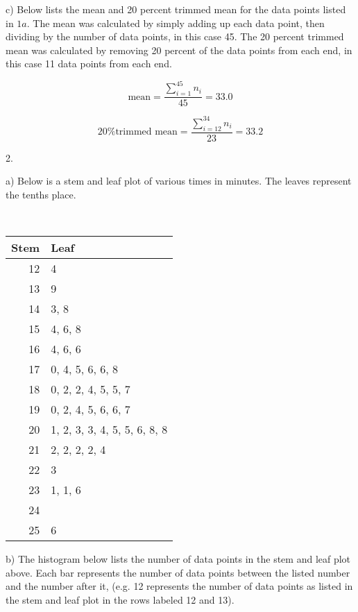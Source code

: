 \documentclass[12pt, letterpaper]{article}
\begin{document}
\qquad c) Below lists the mean and 20 percent trimmed mean for the data points listed in $1a$. The mean was calculated by simply adding up each data point, then dividing by the number of data points, in this case 45. The 20 percent trimmed mean was calculated by removing 20 percent of the data points from each end, in this case 11 data points from each end.

$$\text{mean} = \frac{\sum\limits_{i=1}^{45} n_{i}}{45} = \boxed{33.0}$$

$$\text{20\% trimmed mean} = \frac{\sum\limits_{i=12}^{34} n_{i}}{23} = \boxed{33.2}$$

\pagebreak

2.

\qquad a) Below is a stem and leaf plot of various times in minutes. The leaves represent the tenths place.
\begin{table}[h!]{ \ \ \ }
	\centering
	\begin{tabular}{r|l}
		\textbf{Stem} & \textbf{Leaf} \\ \hline
        12 & 4 \\
        13 & 9\\
        14 & 3, 8\\
        15 & 4, 6, 8\\
        16 & 4, 6, 6\\
        17 & 0, 4, 5, 6, 6, 8\\
        18 & 0, 2, 2, 4, 5, 5, 7\\
        19 & 0, 2, 4, 5, 6, 6, 7\\
        20 & 1, 2, 3, 3, 4, 5, 5, 6, 8, 8\\
        21 & 2, 2, 2, 2, 4\\
        22 & 3\\
        23 & 1, 1, 6\\
        24 & \\
        25 & 6\\
	\end{tabular}
\end{table}

\qquad b) The histogram below lists the number of data points in the stem and leaf plot above. Each bar represents the number of data points between the listed number and the number after it, (e.g. 12 represents the number of data points as listed in the stem and leaf plot in the rows labeled 12 and 13).
\begin{center}
\end{center}
\end{document}
